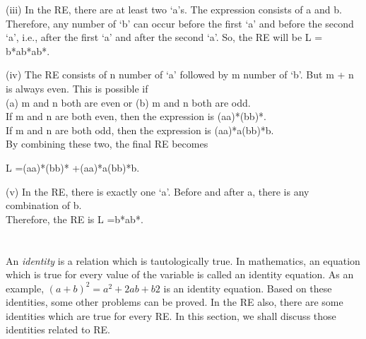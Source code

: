 
	\begin{frame}
		
\!\!\!\!\!\!\!\!\!\!\!\!\!\!\!\!\!\!\!\!\begin{solution}
\noindent\!\!\!\!\!\!\!\!\!\!(iii)	In the RE, there are at least two ‘a’s. The expression consists of a and b. Therefore, any number of ‘b’
can occur before the ﬁrst ‘a’ and before the second ‘a’, i.e., after the ﬁrst ‘a’ and after the second ‘a’. So, the RE will be L = b*ab*ab*.

\end{solution}
		
	\end{frame}	

	\begin{frame}
		
\!\!\!\!\!\!\!\!\!\!\!\!\!\!\!\!\!\!\!\!\begin{solution}
\noindent\!\!\!\!\!\!\!\!\!\!(iv)	The RE consists of n number of ‘a’ followed by m number of ‘b’. But m +  n is always even. This is possible if\\
(a)	m and n both are even or (b) m and n both are odd.\\
If m and n are both even, then the expression is (aa)*(bb)*.\\ If m and n are both odd, then the expression is (aa)*a(bb)*b.\\ By combining these two, the ﬁnal RE becomes

\begin{center}
L =(aa)*(bb)* +(aa)*a(bb)*b.
\end{center}
\end{solution}
		
	\end{frame}	
	\begin{frame}
		
\!\!\!\!\!\!\!\!\!\!\!\!\!\!\!\!\!\!\!\!\begin{solution}
\noindent\!\!\!\!\!\!\!\!\!\!(v)	In the RE, there is exactly one ‘a’. Before and after a, there is any combination of b.\\ Therefore, the RE is L =b*ab*. 

\section{}
An \emph{identity} is a relation which is tautologically true. In mathematics, an equation which is true for every value of the variable is called an identity equation. As an example, $(a +b)^2 =a^2 +2ab+ b2$ is an identity equation. Based on these identities, some other problems can be proved. In the RE also, there are some identities which are true for every RE. In this section, we shall discuss those identities related to RE.

\end{solution}
		
	\end{frame}	

